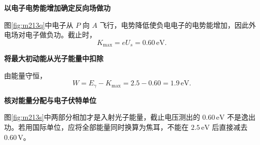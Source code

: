 \begin{solution}\textbf{以电子电势能增加确定反向场做功}\par\nobreak
图\ref{fig:m213q}中电子从 \(P\) 向 \(A\) 飞行，电势降低使负电电子的电势能增加，因此外电场对电子做负功。截止时，
\[
 K_{\max}=eU_s=0.60\,\mathrm{eV}.
\]


\par\medskip{}\noindent\textbf{将最大初动能从光子能量中扣除}\par\nobreak
由能量守恒，
\[
 \boxed{W=E_\gamma-K_{\max}
 =2.5-0.60=1.9\,\mathrm{eV}}.
\]


\par\medskip{}\noindent\textbf{核对能量分配与电子伏特单位}\par\nobreak
图\ref{fig:m213s}中两部分相加才是入射光子能量，截止电压测出的 \(0.60\,\mathrm{eV}\) 不是逸出功。若用国际单位，应将全部能量同时换算为焦耳，不能在 \(2.5\,\mathrm{eV}\) 后直接减去 \(0.60\,\mathrm V\)。
\end{solution}

